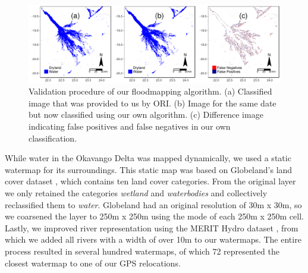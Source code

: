 \documentclass[abstract=on,10pt,a4paper,bibliography=totocnumbered]{scrartcl}
\begin{document}
\begin{figure}[ht]
  \begin{center}
    \includegraphics[width = \textwidth]{99_FloodmappingValidation.pdf}
    \caption{Validation procedure of our floodmapping algorithm. (a) Classified
    image that was provided to us by ORI. (b) Image for the same date but now
    classified using our own algorithm. (c) Difference image indicating false
    positives and false negatives in our own classification.}
    \label{FloodmappingValidation}
  \end{center}
\end{figure}

\noindent While water in the Okavango Delta was mapped dynamically, we used a
static watermap for its surroundings. This static map was based on Globeland's
land cover dataset \citep{Chen.2015}, which contains ten land cover categories.
From the original layer we only retained the categories \textit{wetland} and
\textit{waterbodies} and collectively reclassified them to \textit{water}.
Globeland had an original resolution of 30m x 30m, so we coarsened the layer to
250m x 250m using the mode of each 250m x 250m cell. Lastly, we improved river
representation using the MERIT Hydro dataset \citep{Yamazaki.2019}, from which
we added all rivers with a width of over 10m to our watermaps. The entire
process resulted in several hundred watermaps, of which 72 represented the
closest watermap to one of our GPS relocations.
\end{document}
